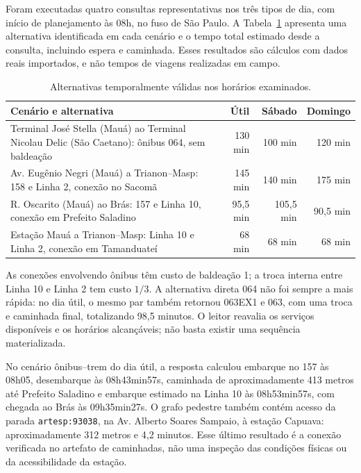Foram executadas quatro consultas representativas nos três tipos de dia, com início de planejamento às 08h, no fuso de São Paulo. A Tabela~\ref{tab:artesp-maua-consultas} apresenta uma alternativa identificada em cada cenário e o tempo total estimado desde a consulta, incluindo espera e caminhada. Esses resultados são cálculos com dados reais importados, e não tempos de viagens realizadas em campo.

\begin{table}[H]\centering\small
\caption{Alternativas temporalmente válidas nos horários examinados.}\label{tab:artesp-maua-consultas}
\begin{tabular}{p{8.4cm}rrr}\hline
Cenário e alternativa & Útil & Sábado & Domingo\\\hline
Terminal José Stella (Mauá) ao Terminal Nicolau Delic (São Caetano): ônibus 064, sem baldeação & 130 min & 100 min & 120 min\\[5pt]
Av. Eugênio Negri (Mauá) a Trianon--Masp: 158 e Linha 2, conexão no Sacomã & 145 min & 140 min & 175 min\\[5pt]
R. Oscarito (Mauá) ao Brás: 157 e Linha 10, conexão em Prefeito Saladino & 95,5 min & 105,5 min & 90,5 min\\[5pt]
Estação Mauá a Trianon--Masp: Linha 10 e Linha 2, conexão em Tamanduateí & 68 min & 68 min & 68 min\\\hline
\end{tabular}
\end{table}

As conexões envolvendo ônibus têm custo de baldeação 1; a troca interna entre Linha 10 e Linha 2 tem custo $1/3$. A alternativa direta 064 não foi sempre a mais rápida: no dia útil, o mesmo par também retornou 063EX1 e 063, com uma troca e caminhada final, totalizando 98,5 minutos. O leitor reavalia os serviços disponíveis e os horários alcançáveis; não basta existir uma sequência materializada.

No cenário ônibus--trem do dia útil, a resposta calculou embarque no 157 às 08h05, desembarque às 08h43min57s, caminhada de aproximadamente 413 metros até Prefeito Saladino e embarque estimado na Linha 10 às 08h53min57s, com chegada ao Brás às 09h35min27s. O grafo pedestre também contém acesso da parada \texttt{artesp:93038}, na Av. Alberto Soares Sampaio, à estação Capuava: aproximadamente 312 metros e 4,2 minutos. Esse último resultado é a conexão verificada no artefato de caminhadas, não uma inspeção das condições físicas ou da acessibilidade da estação.

